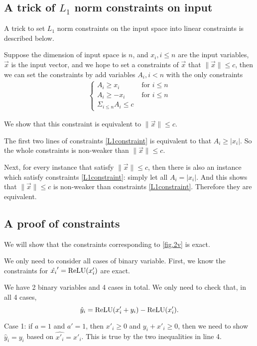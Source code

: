 \subsection*{A trick of $L_1$ norm constraints on input}

A trick to set $L_1$ norm constraints on the input space into linear constraints is described below.

Suppose the dimension of input space is $n$, and $x_i,i\leq n$ are the input variables, $\vec{x}$ is the input vector, and we hope to set a constraints of $\vec{x}$ that $\|\vec{x}\| \leq c$,  then we can set the constraints by add variables $A_i,i<n$ with the only constraints \begin{align}\label{L1constraint}\begin{cases}
	A_i \geq x_i &\text{ for }i \leq n\\ 
	A_i\geq -x_i &\text{ for }i \leq n\\
	\Sigma_{i\leq n} A_i \leq c	&\end{cases}
\end{align}

We show that this constraint is equivalent to $\|\vec{x}\| \leq c$.

The first two lines of constraints \ref{L1constraint} is equivalent to that $A_i\geq |x_i|$. So the whole constraints is non-weaker than $\|\vec{x}\| \leq c$.

Next, for every instance that satisfy $\|\vec{x}\| \leq c$, then there is also an instance which satisfy constraints \ref{L1constraint}: simply let all $A_i = |x_i|$. And this shows that $\|\vec{x}\| \leq c$ is non-weaker than constraints \ref{L1constraint}. Therefore they are equivalent.




\subsection*{A proof of constraints}


We will show that the constraints corresponding to \ref{fig.2v} is exact.

We only need to consider all cases of binary variable. First, we know the constraints for $\hat{x_i}'=\mathrm{ReLU}(x_i')$ are exact. 

We have 2 binary variables and 4 cases in total. We only need to check that, in all 4 cases, $$\hat{y}_i = \mathrm{ReLU}(x'_i+y_i)-\mathrm{ReLU}(x'_i).$$

Case 1: if $a = 1$ and $a' = 1$, then $x'_i \geq 0 $ and $y_i+x'_i\geq 0$, then we need to show $\hat{y}_i = y_i$ based on  $\hat{x'_i} = x'_i$. This is true by the two inequalities in line 4.

